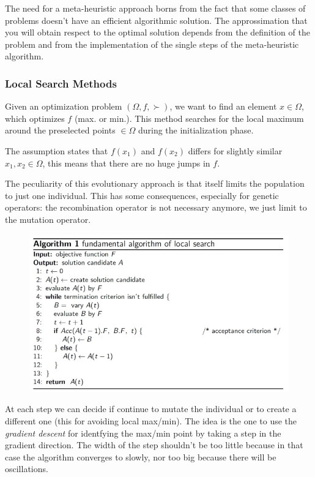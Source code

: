 \documentclass{article}
\begin{document}
The need for a meta-heuristic approach borns from the fact that some classes of problems doesn't
have an efficient algorithmic solution. The approssimation that you will obtain respect to the
optimal solution depends from the definition of the problem and from the implementation of the single
steps of the meta-heuristic algorithm.

\subsubsection{Local Search Methods}
Given an optimization problem $(\Omega, f, \succ)$, we want to find an element $x\in\Omega$, which
optimizes $f$ (max. or min.). This method searches for the local maximum around the preselected
points $\in\Omega$ during the initialization phase.

The assumption states that $f(x_1)$ and $f(x_2)$ differs for slightly similar $x_1,x_2\in\Omega$, this
means that there are no huge jumps in $f$.

The peculiarity of this evolutionary approach is that itself limits the population to just one
individual. This has some consequences, especially for genetic operators: the recombination operator
is not necessary anymore, we just limit to the mutation operator.

\begin{figure}[H]
    \centering
    \includegraphics[scale=0.6]{images/local_search_method.png}
\end{figure}
At each step we can decide if continue to mutate the individual or to create a different one (this for
avoiding local max/min). The idea is the one to use the \textit{gradient descent} for identfying
the max/min point by taking a step in the gradient direction. The width of the step shouldn't be
too little because in that case the algorithm converges to slowly, nor too big because there will
be oscillations.
\end{document}
